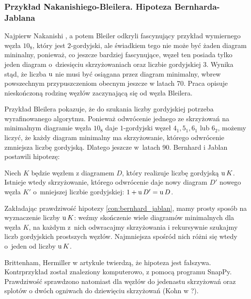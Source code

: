 
\subsubsection{Przykład Nakanishiego-Bleilera. Hipoteza Bernharda-Jablana}
Najpierw Nakanishi \cite{nakanishi83}, a potem Bleiler \cite{bleiler84} odkryli fascynujący przykład wymiernego węzła $10_8$, który jest $2$-gordyjski, ale świadkiem tego nie może być żaden diagram mininalny, ponieważ, co jeszcze bardziej fascynujące, węzeł ten posiada tylko jeden diagram o~dziesięciu skrzyżowaniach oraz liczbie gordyjskiej 3.
%
%
%
Wynika stąd, że liczba $\operatorname{u}$ nie musi być osiągana przez diagram minimalny, wbrew powszechnym przypuszczeniom obecnym jeszcze w latach 70.
Praca \cite{bernhard94} opisuje nieskończoną rodzinę węzłów zaczynającą się od węzła Bleilera.

Przykład Bleilera pokazuje, że do szukania liczby gordyjskiej potrzeba wyrafinowanego algorytmu.
Ponieważ odwrócenie jednego ze skrzyżowań na minimalnym diagramie węzła $10_8$ daje $1$-gordyjski węzeł $4_1, 5_1, 6_1$ lub $6_2$, możemy liczyć, że każdy diagram minimalny ma skrzyżowanie, którego odwrócenie zmniejsza liczbę gordyjską.
Dlatego jeszcze w~latach 90. Bernhard \cite{bernhard94} i Jablan \cite{jablan98} postawili hipotezę:

\begin{conjecture}
%
%
%
\label{con:bernhard_jablan}%
    Niech $K$ będzie węzłem z diagramem $D$, który realizuje liczbę gordyjską $\operatorname{u} K$.
    Istnieje wtedy skrzyżowanie, którego odwrócenie daje nowy diagram $D'$ nowego węzła $K'$ o~mniejszej liczbie gordyjskiej: $1 + \operatorname{u} D' = \operatorname{u} D$.
\end{conjecture}

Zakładając prawdziwość hipotezy \ref{con:bernhard_jablan}, mamy prosty sposób na wyznaczenie liczby $\operatorname{u} K$: weźmy skończenie wiele diagramów minimalnych dla węzła $K$, na każdym z~nich odwracajmy skrzyżowania i rekursywnie szukajmy liczb gordyjskich prostszych węzłów.
Najmniejsza spośród nich różni się wtedy o~jeden od liczby $\operatorname{u} K$.

Brittenham, Hermiller w artykule \cite{brittenham21} twierdzą, że hipoteza jest fałszywa.
Kontrprzykład został znaleziony komputerowo, z pomocą programu SnapPy.
%
%
Prawdziwość sprawdzono natomiast dla węzłów do jedenastu skrzyżowań oraz splotów o dwóch ogniwach do dziewięciu skrzyżowań (Kohn w \cite{kohn93}?).
%

